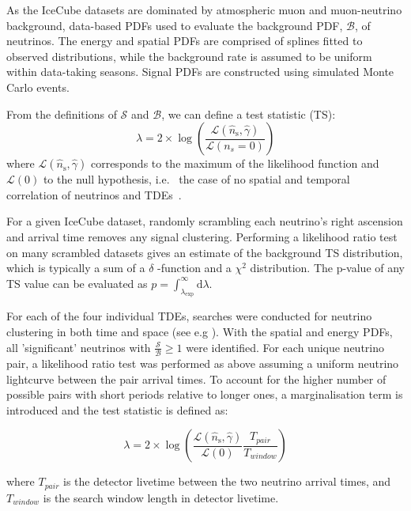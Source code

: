\documentclass[twocolumn, tighten, linenumbers]{aastex62}
\begin{document}
As the IceCube datasets are dominated by atmospheric muon and muon-neutrino background, data-based PDFs used to evaluate the background PDF, $\mathcal{B}$,  of neutrinos. The energy and spatial PDFs are comprised of splines fitted to observed distributions, while the background rate is assumed to be uniform within data-taking seasons. Signal PDFs are constructed using simulated              Monte Carlo events.

From the definitions of $\mathcal{S}$ and $\mathcal{B}$, we can define a test statistic (TS):
\begin{equation*}
\lambda = 2\times \log \left( \frac{\mathcal{L}(\hat{n}_\text{s}, \hat{\gamma})}{\mathcal{L}(n_{s}=0)} \right)
\end{equation*}
where $\mathcal{L}(\hat{n}_\text{s}, \hat{\gamma})$ corresponds to the maximum of the likelihood function and $\mathcal{L}(0)$ to the null hypothesis, i.e.~ the case of no spatial and temporal correlation of neutrinos and TDEs~\citep{Braun:2008bg, Braun:2009aa}. 

For a given IceCube dataset, randomly scrambling each neutrino's right ascension and arrival time removes any signal clustering. Performing a likelihood ratio test on many scrambled datasets gives an estimate of the background TS distribution, which is typically a sum of a $\delta $ -function and a $\chi^{2}$ distribution. The p-value of any TS value can be evaluated as $p = \int_{\lambda_\text{exp}}^\infty \mathrm{d}\lambda$.

For each of the four individual TDEs, searches were conducted for neutrino clustering in both time and space (see e.g \cite{IceCube:2018cha}). With the spatial and energy PDFs, all 'significant' neutrinos with $\frac{\mathcal{S}}{\mathcal{B}} \geq 1$ were identified. For each unique neutrino pair, a likelihood ratio test was performed as above assuming a uniform neutrino lightcurve between the pair arrival times. To account for the higher number of possible pairs with short periods relative to longer ones, a marginalisation term is introduced and the test statistic is defined as:

\begin{equation*}
\lambda = 2\times \log \left( \frac{\mathcal{L}(\hat{n}_\text{s}, \hat{\gamma})}{\mathcal{L}(0)} \frac{T_{pair}}{T_{window}}\right)
\end{equation*}

where $T_{pair}$ is the detector livetime between the two neutrino arrival times, and $T_{window}$ is the search window length in detector livetime.
\end{document}
